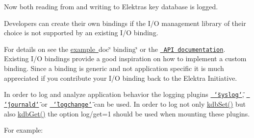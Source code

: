 Now both reading from and writing to Elektra\textquotesingle{}s key database is logged.

Developers can create their own bindings if the I/O management library of their choice is not supported by an existing I/O binding.

For details on see the \mbox{\hyperlink{md_src_bindings_io_doc_README_src_bindings_io_doc_README_md}{example }}doc\char`\"{} binding\char`\"{} or the \href{https://doc.libelektra.org/api/current/html/group__kdbio.html}{\texttt{ A\+PI documentation}}. Existing I/O bindings provide a good inspiration on how to implement a custom binding. Since a binding is generic and not application specific it is much appreciated if you contribute your I/O binding back to the Elektra Initiative.

In order to log and analyze application behavior the logging plugins \href{https://www.libelektra.org/plugins/syslog}{\texttt{ \char`\"{}syslog\char`\"{}}}, \href{https://www.libelektra.org/plugins/journald}{\texttt{ \char`\"{}journald\char`\"{}}} or \href{https://www.libelektra.org/plugins/logchange}{\texttt{ \char`\"{}logchange\char`\"{}}} can be used. In order to log not only {\ttfamily \mbox{\hyperlink{group__kdb_ga11436b058408f83d303ca5e996832bcf}{kdb\+Set()}}} but also {\ttfamily \mbox{\hyperlink{group__kdb_ga28e385fd9cb7ccfe0b2f1ed2f62453a1}{kdb\+Get()}}} the option {\ttfamily log/get=1} should be used when mounting these plugins.

For example\+:


\begin{DoxyCode}{0}
\end{DoxyCode}
 
